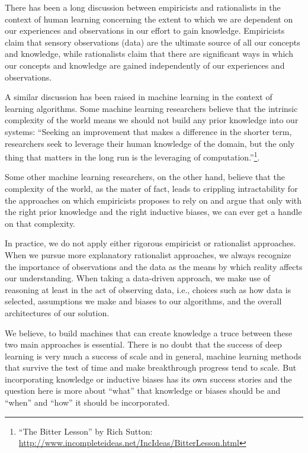 There has been a long discussion between empiricists and rationalists in the context of human learning concerning the extent to which we are dependent on our experiences and observations in our effort to gain knowledge.  
%
Empiricists claim that sensory observations (data) are the ultimate source of all our concepts and knowledge, while rationalists claim that there are significant ways in which our concepts and knowledge are gained independently of our experiences and observations. 

A similar discussion has been raised in machine learning in the context of learning algorithms.
%
Some machine learning researchers believe that the intrinsic complexity of the world means we should not build any prior knowledge into our systems: ``Seeking an improvement that makes a difference in the shorter term, researchers seek to leverage their human knowledge of the domain, but the only thing that matters in the long run is the leveraging of computation.''\footnote{``The Bitter Lesson'' by Rich Sutton: \url{http://www.incompleteideas.net/IncIdeas/BitterLesson.html}}. 

Some other machine learning researchers, on the other hand, believe that the complexity of the world, as the mater of fact, leads to crippling intractability for the approaches on which empiricists proposes to rely on and argue that only with the right prior knowledge and the right inductive biases, we can ever get a handle on that complexity.

In practice, we do not apply either rigorous empiricist or rationalist approaches.  When we pursue more explanatory rationalist approaches, we always recognize the importance of observations and the data as the means by which reality affects our understanding.  When taking a data-driven approach, we make use of reasoning at least in the act of observing data, i.e., choices such as how data is selected, assumptions we make and biases to our algorithms, and the overall architectures of our solution. 

We believe, to build machines that can create knowledge a truce between these two main approaches is essential.
There is no doubt that the success of deep learning is very much a success of scale and in general, machine learning methods that survive the test of time and make breakthrough progress tend to scale.
But incorporating knowledge or inductive biases has its own success stories and the question here is more about ``what'' that knowledge or biases should be and ``when'' and ``how'' it should be incorporated. 

